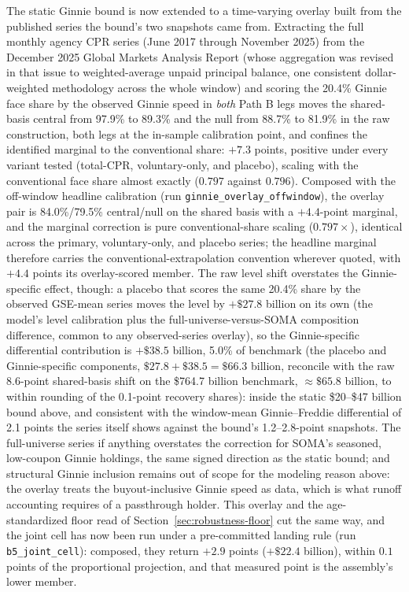 \documentclass[12pt]{article}
\begin{document}
The static Ginnie bound is now extended to a time-varying overlay built from the published series the bound's two snapshots came from. Extracting the full monthly agency CPR series (June 2017 through November 2025) from the December 2025 Global Markets Analysis Report (whose aggregation was revised in that issue to weighted-average unpaid principal balance, one consistent dollar-weighted methodology across the whole window) and scoring the 20.4\% Ginnie face share by the observed Ginnie speed in \emph{both} Path B legs moves the shared-basis central from 97.9\% to 89.3\% and the null from 88.7\% to 81.9\% in the raw construction, both legs at the in-sample calibration point, and confines the identified marginal to the conventional share: $+7.3$ points, positive under every variant tested (total-CPR, voluntary-only, and placebo), scaling with the conventional face share almost exactly ($0.797$ against $0.796$). Composed with the off-window headline calibration (run \texttt{ginnie\_overlay\_offwindow}), the overlay pair is 84.0\%/79.5\% central/null on the shared basis with a $+4.4$-point marginal, and the marginal correction is pure conventional-share scaling ($0.797\times$), identical across the primary, voluntary-only, and placebo series; the headline marginal therefore carries the conventional-extrapolation convention wherever quoted, with $+4.4$ points its overlay-scored member. The raw level shift overstates the Ginnie-specific effect, though: a placebo that scores the same 20.4\% share by the observed GSE-mean series moves the level by $+\$27.8$ billion on its own (the model's level calibration plus the full-universe-versus-SOMA composition difference, common to any observed-series overlay), so the Ginnie-specific differential contribution is $+\$38.5$ billion, 5.0\% of benchmark (the placebo and Ginnie-specific components, $\$27.8 + \$38.5 = \$66.3$ billion, reconcile with the raw 8.6-point shared-basis shift on the \$764.7 billion benchmark, $\approx\$65.8$ billion, to within rounding of the 0.1-point recovery shares): inside the static \$20--\$47 billion bound above, and consistent with the window-mean Ginnie--Freddie differential of 2.1 points the series itself shows against the bound's 1.2--2.8-point snapshots. The full-universe series if anything overstates the correction for SOMA's seasoned, low-coupon Ginnie holdings, the same signed direction as the static bound; and structural Ginnie inclusion remains out of scope for the modeling reason above: the overlay treats the buyout-inclusive Ginnie speed as data, which is what runoff accounting requires of a passthrough holder. This overlay and the age-standardized floor read of Section~\ref{sec:robustness-floor} cut the same way, and the joint cell has now been run under a pre-committed landing rule (run \texttt{b5\_joint\_cell}): composed, they return $+2.9$ points ($+\$22.4$ billion), within $0.1$ points of the proportional projection, and that measured point is the assembly's lower member.
\end{document}

